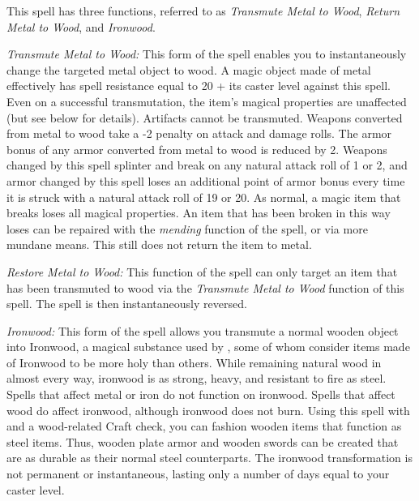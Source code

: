 This spell has three functions, referred to as \emph{Transmute Metal to Wood}, \emph{Return Metal to Wood}, and \emph{Ironwood}.

\begin{list}{}{\leftmargin=1em}
 \item \emph{Transmute Metal to Wood:} This form of the spell enables you to instantaneously change the targeted metal object to wood.
A magic object made of metal effectively has spell resistance equal to 20 + its caster level against this spell.
Even on a successful transmutation, the item's magical properties are unaffected (but see below for details).
Artifacts cannot be transmuted. 
Weapons converted from metal to wood take a -2 penalty on attack and damage rolls. 
The armor bonus of any armor converted from metal to wood is reduced by 2. 
Weapons changed by this spell splinter and break on any natural attack roll of 1 or 2, and armor changed by this spell loses an additional point of armor bonus every time it is struck with a natural attack roll of 19 or 20.
As normal, a magic item that breaks loses all magical properties.
An item that has been broken in this way loses can be repaired with the \emph{mending} function of the  spell, or via more mundane means. This still does not return the item to metal.
 \item \emph{Restore Metal to Wood:} This function of the spell can only target an item that has been transmuted to wood via the \emph{Transmute Metal to Wood} function of this spell. The spell is then instantaneously reversed.
\item \emph{Ironwood:} This form of the spell allows you transmute a normal wooden object into Ironwood, a magical substance used by , some of whom consider items made of Ironwood to be more holy than others. 
While remaining natural wood in almost every way, ironwood is as strong, heavy, and resistant to fire as steel. 
Spells that affect metal or iron do not function on ironwood. 
Spells that affect wood do affect ironwood, although ironwood does not burn. 
Using this spell with  and a wood-related Craft check, you can fashion wooden items that function as steel items. 
Thus, wooden plate armor and wooden swords can be created that are as durable as their normal steel counterparts. 
The ironwood transformation is not permanent or instantaneous, lasting only a number of days equal to your caster level.
\end{list}
